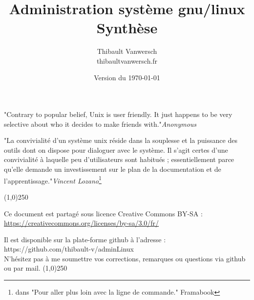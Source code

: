\documentclass[a4paper,11pt]{article}
\title{Administration système gnu/linux\\Synthèse}
\author{
    Thibault Vanwersch \\
    thibault\at vanwersch.fr
}
\date{Version du \today}
\begin{document}
\maketitle
\par{"Contrary to popular belief, Unix is user friendly. It just happens to be very selective about who it decides to make friends with."\hfill\emph{Anonymous}}

\par{"La convivialité d’un système unix réside dans la souplesse et la puissance des outils dont on dispose pour dialoguer avec le système. Il s’agit certes d’une convivialité à laquelle peu d’utilisateurs sont habitués ; essentiellement parce qu’elle demande un investissement sur le plan de la documentation et de l’apprentissage."\hfill\emph{Vincent Lozano}\footnote{dans "Pour aller plus loin avec la ligne de commande." Framabook}}

\begin{center}
\line(1,0){250}
\par Ce document est partagé sous licence Creative Commons BY-SA :\\
\url{https://creativecommons.org/licenses/by-sa/3.0/fr/}
\par Il est disponible sur la plate-forme github à l'adresse :\\
https://github.com/thibault-v/adminLinux \\
N'hésitez pas à me soumettre vos corrections, remarques ou questions via github ou par mail.
\line(1,0){250}
\end{center}
\end{document}
